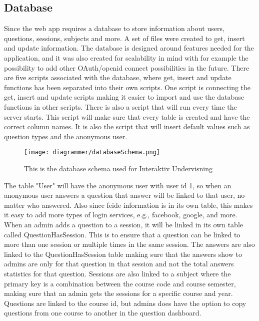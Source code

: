 \subsection{Database}
Since the web app requires a database to store information about users, questions, sessions, subjects and more. A set of files were created to get, insert and update information. The database is designed around features needed for the application, and it was also created for scalability in mind with for example the possibility to add other OAuth/openid connect possibilities in the future. There are five scripts associated with the database, where get, insert and update functions has been separated into their own scripts. One script is connecting the get, insert and update scripts making it easier to import and use the database functions in other scripts. There is also a script that will run every time the server starts. This script will make sure that every table is created and have the correct column names. It is also the script that will insert default values such as question types and the anonymous user.
\begin{figure}[H]
    \centering
    \texttt{[image: diagrammer/databaseSchema.png]}
    \caption{This is the database schema used for Interaktiv Undervisning}
    \label{fig:dbSchema}
\end{figure}
The table "User" will have the anonymous user with user id 1, so when an anonymous user answers a question that answer will be linked to that user, no matter who answered. Also since feide information is in its own table, this makes it easy to add more types of login services, e.g., facebook, google, and more. When an admin adds a question to a session, it will be linked in its own table called QuestionHasSession. This is to ensure that a question can be linked to more than one session or multiple times in the same session. The answers are also linked to the QuestionHasSession table making sure that the answers show to admins are only for that question in that session and not the total answers statistics for that question. Sessions are also linked to a subject where the primary key is a combination between the course code and course semester, making sure that an admin gets the sessions for a specific course and year. Questions are linked to the course id, but admins does have the option to copy questions from one course to another in the question dashboard.